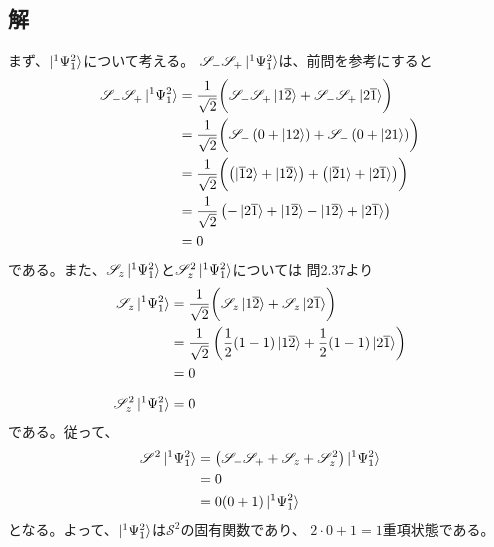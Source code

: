 \subsection{解}
まず、$\ket{^1\Psi_1^2}$について考える。
$\mathscr{S}_- \mathscr{S}_+\ket{^1\Psi_1^2}$は、前問を参考にすると
\begin{align}
	\mathscr{S}_- \mathscr{S}_+ \ket{^1\Psi_1^2}
&=
	\frac{1}{\sqrt{2}}
	\biggl(
		\mathscr{S}_- \mathscr{S}_+ \ket{\aorb{1}\borb{2}}
		+
		\mathscr{S}_- \mathscr{S}_+ \ket{\aorb{2}\borb{1}}
	\biggr) \\
%
%
&=
	\frac{1}{\sqrt{2}}
	\biggl(
		\mathscr{S}_-\left(
			0 +\ket{\aorb{1}\aorb{2}}
		\right)
		+
		\mathscr{S}_-\left(
			0 +\ket{\aorb{2}\aorb{1}}
		\right)
	\biggr) \\
%
%
&=
	\frac{1}{\sqrt{2}}
	\biggl(
		\left(
			\ket{\borb{1}\aorb{2}}
			+
			\ket{\aorb{1}\borb{2}}
		\right)
		+
		\left(
			\ket{\borb{2}\aorb{1}}
			+
			\ket{\aorb{2}\borb{1}}
		\right)
	\biggr) \\
%
%
&=
	\frac{1}{\sqrt{2}}
	\left(
		-\ket{\aorb{2}\borb{1}}
		+\ket{\aorb{1}\borb{2}}
		-\ket{\aorb{1}\borb{2}}
		+\ket{\aorb{2}\borb{1}}
	\right) \\
%
%
&=
	0
\end{align}
である。また、$\mathscr{S}_z\ket{^1\Psi_1^2}$と$\mathscr{S}_z^2\ket{^1\Psi_1^2}$については
問2.37より
\begin{align}
	\mathscr{S}_z\ket{^1\Psi_1^2}
&=
	\frac{1}{\sqrt{2}}
	\biggl(
		\mathscr{S}_z \ket{\aorb{1}\borb{2}}
		+
		\mathscr{S}_z \ket{\aorb{2}\borb{1}}
	\biggr) \\
%
%
&=
	\frac{1}{\sqrt{2}}
	\left(
		\frac{1}{2} (1-1) \ket{\aorb{1}\borb{2}}
		+
		\frac{1}{2} (1-1) \ket{\aorb{2}\borb{1}}
	\right) \\
%
%
&=
	0 \\[2mm]
%
%
	\mathscr{S}_z^2 \ket{^1\Psi_1^2}
&=
	0
\end{align}
である。従って、
\begin{align}
	\mathscr{S}^2 \ket{^1\Psi_1^2}
&=
	\left(
		\mathscr{S}_- \mathscr{S}_+
		+
		\mathscr{S}_z
		+
		\mathscr{S}_z^2
	\right) \ket{^1\Psi_1^2} \\
%
%
&=
	0 \\
%
%
&=
	0 (0+1) \ket{^1\Psi_1^2}
\end{align}
となる。よって、$\ket{^1\Psi_1^2}$は$\mathscr{S}^2$の固有関数であり、
$2\cdot 0+1=1$重項状態である。


